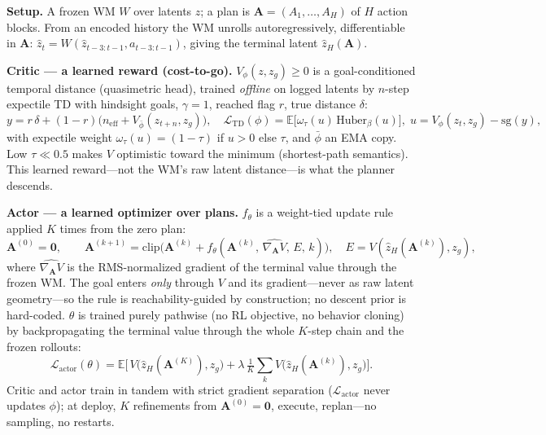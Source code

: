\documentclass{article} %
\theoremstyle{plain}
\theoremstyle{definition}
\begin{document}
\textbf{Setup.} A frozen WM $W$ over latents $z$; a plan is $\mathbf A=(A_1,\dots,A_H)$
of $H$ action blocks. From an encoded history the WM unrolls autoregressively,
differentiable in $\mathbf A$: $\hat z_t = W(\hat z_{t-3:t-1}, a_{t-3:t-1})$,
giving the terminal latent $\hat z_H(\mathbf A)$.

\textbf{Critic --- a learned reward (cost-to-go).} $V_\phi(z,z_g)\!\ge\!0$ is a
goal-conditioned temporal distance (quasimetric head), trained \emph{offline} on
logged latents by $n$-step expectile TD with hindsight goals, $\gamma\!=\!1$,
reached flag $r$, true distance $\delta$:
\begin{equation}
y = r\,\delta + (1{-}r)\big(n_{\mathrm{eff}} + V_{\bar\phi}(z_{t+n},z_g)\big),
\quad
\mathcal L_{\mathrm{TD}}(\phi)=\mathbb E\big[\omega_\tau(u)\,\mathrm{Huber}_\beta(u)\big],\;
u=V_\phi(z_t,z_g)-\mathrm{sg}(y),
\end{equation}
with expectile weight $\omega_\tau(u){=}(1{-}\tau)$ if $u{>}0$ else $\tau$, and
$\bar\phi$ an EMA copy. Low $\tau{\ll}0.5$ makes $V$ optimistic toward the
minimum (shortest-path semantics). This learned reward---not the WM's raw latent
distance---is what the planner descends.

\textbf{Actor --- a learned optimizer over plans.} $f_\theta$ is a weight-tied
update rule applied $K$ times from the zero plan:
\begin{equation}
\mathbf A^{(0)}{=}\mathbf 0,\qquad
\mathbf A^{(k+1)}=\mathrm{clip}\!\big(\mathbf A^{(k)}+f_\theta(\mathbf A^{(k)},\,\widehat{\nabla_{\!\mathbf A}V},\,E,\,k)\big),
\quad E=V(\hat z_H(\mathbf A^{(k)}),z_g),
\end{equation}
where $\widehat{\nabla_{\!\mathbf A}V}$ is the RMS-normalized gradient of the
terminal value through the frozen WM. The goal enters \emph{only} through $V$ and
its gradient---never as raw latent geometry---so the rule is reachability-guided
by construction; no descent prior is hard-coded. $\theta$ is trained purely
pathwise (no RL objective, no behavior cloning) by backpropagating the terminal
value through the whole $K$-step chain and the frozen rollouts:
\begin{equation}
\mathcal L_{\mathrm{actor}}(\theta)=\mathbb E\Big[\,V\big(\hat z_H(\mathbf A^{(K)}),z_g\big)+\lambda\,\tfrac1K\textstyle\sum_k V\big(\hat z_H(\mathbf A^{(k)}),z_g\big)\Big].
\end{equation}
Critic and actor train in tandem with strict gradient separation ($\mathcal
L_{\mathrm{actor}}$ never updates $\phi$); at deploy, $K$ refinements from
$\mathbf A^{(0)}{=}\mathbf 0$, execute, replan---no sampling, no restarts.
\end{document}
